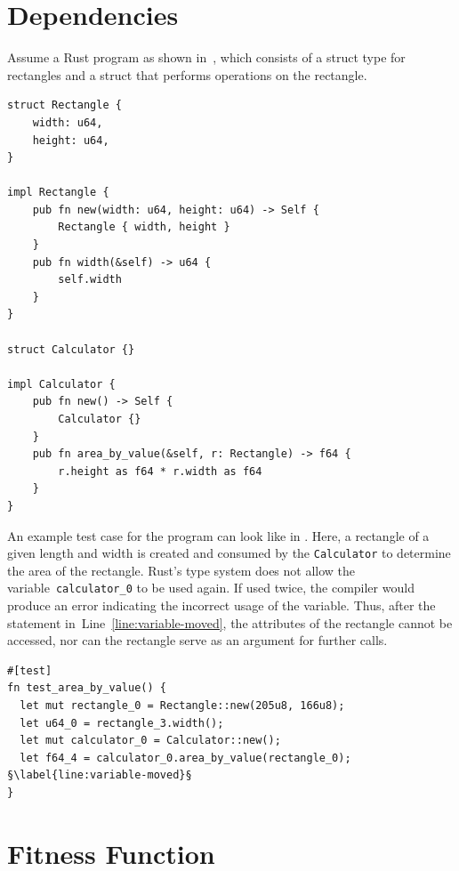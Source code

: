 \documentclass[paper=a4,%
  twoside,%
  BCOR4mm,%
  abstract=true,%
  toc=bibliography,%
  chapterprefix=true,%
  toc=bibliographynumbered,%
  open=right,%
  english,%
  pagesize=pdftex]{scrreprt}
\begin{document}

\section{Dependencies}
\label{sec:dependencies}
Assume a Rust program as shown in~, which consists of a struct type for rectangles and a struct that performs operations on the rectangle.
\begin{lstlisting}[style=boxed, caption={Rectangle data type}, label=lst:example-rust-program]
struct Rectangle {
    width: u64,
    height: u64,
}

impl Rectangle {
    pub fn new(width: u64, height: u64) -> Self {
        Rectangle { width, height }
    }
    pub fn width(&self) -> u64 {
        self.width
    }
}

struct Calculator {}

impl Calculator {
    pub fn new() -> Self {
        Calculator {}
    }
    pub fn area_by_value(&self, r: Rectangle) -> f64 {
        r.height as f64 * r.width as f64
    }
}
\end{lstlisting}

An example test case for the program can look like in . Here, a rectangle of a given length and width is created and consumed by the \texttt{Calculator} to determine the area of the rectangle. Rust's type system does not allow the variable~\texttt{calculator\string_0} to be used again. If used twice, the compiler would produce an error indicating the incorrect usage of the variable. Thus, after the statement in~Line~\ref{line:variable-moved}, the attributes of the rectangle cannot be accessed, nor can the rectangle serve as an argument for further calls.

\begin{lstlisting}[style=boxed, escapechar=§, caption={An example test case generated for the program in \Cref{lst:example-rust-program}}, label=lst:example-testcase]
#[test]
fn test_area_by_value() {
  let mut rectangle_0 = Rectangle::new(205u8, 166u8);
  let u64_0 = rectangle_3.width();
  let mut calculator_0 = Calculator::new();
  let f64_4 = calculator_0.area_by_value(rectangle_0); §\label{line:variable-moved}§
}
\end{lstlisting}

\section{Fitness Function}
\label{sec:fitness-function}
\end{document}
